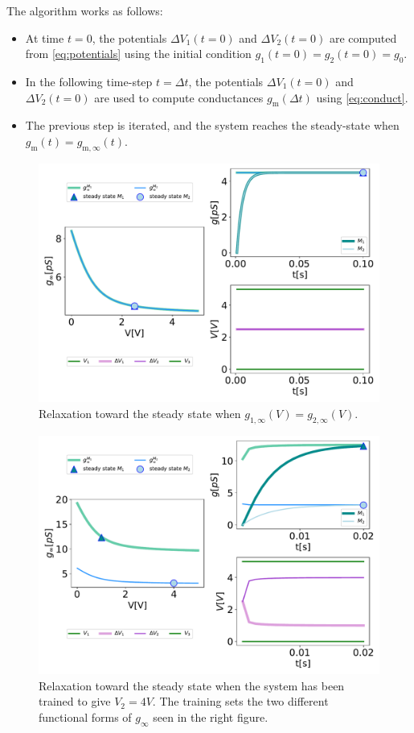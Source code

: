 \documentclass[reprint,superscriptaddress,prb,showkeys]{revtex4-2}
\newcommand{\m}{\text{m}} %
\begin{document}
The algorithm works as follows:

\begin{itemize}

    \item At time $t=0$, the potentials $\Delta V_1(t=0)$ and $\Delta V_2(t=0)$ are computed from \cref{eq:potentials} using the initial condition $g_1(t=0)=g_2(t=0)=g_0$.
    \item In the following time-step $t=\Delta t$, the potentials $\Delta V_1(t=0)$ and $\Delta V_2(t=0)$ are used to compute conductances $g_{\m}(\Delta t)$ using \cref{eq:conduct}.
    \item The previous step is iterated, and the system reaches the steady-state when $g_{\m}(t)=g_{\m,\infty}(t)$.

\end{itemize}

\begin{figure}[h]
    \centering
    \includegraphics[width=0.8\columnwidth]{plots/appendixA/grid_initial_condition.pdf}
    \caption{Relaxation toward the steady
    state when $g_{1,\infty}(V)=g_{2,\infty}(V)$.}
    \label{fig:memristor_network}
\end{figure} 

\begin{figure}[h]
    \centering
    \includegraphics[width=0.8\columnwidth]{plots/appendixA/grid_trained.pdf}
    \caption{Relaxation toward the steady state when the system has been trained to give $V_2 = 4V$. The training sets the two different functional forms of $g_{\infty}$ seen in the right figure.}
    \label{fig:memristor_network}
\end{figure} 
\end{document}
